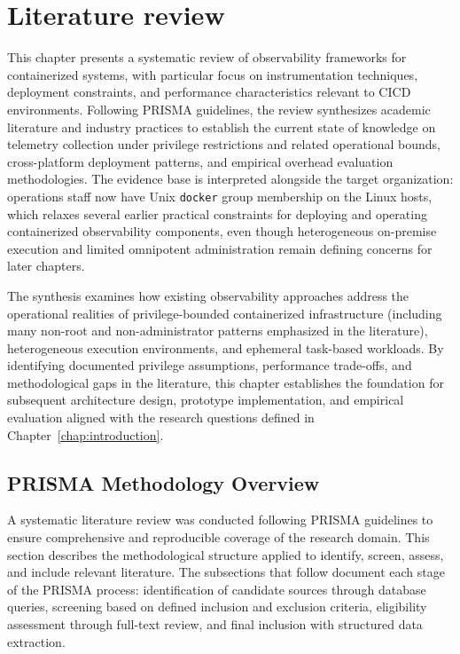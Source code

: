 
\chapter{Literature review} %
\label{chap:literature} %

This chapter presents a systematic review of observability frameworks for containerized systems, with particular focus on instrumentation techniques, deployment constraints, and performance characteristics relevant to \ac{CICD} environments. Following \ac{PRISMA} guidelines, the review synthesizes academic literature and industry practices to establish the current state of knowledge on telemetry collection under privilege restrictions and related operational bounds, cross-platform deployment patterns, and empirical overhead evaluation methodologies. The evidence base is interpreted alongside the target organization: operations staff now have Unix \texttt{docker} group membership on the Linux hosts, which relaxes several earlier practical constraints for deploying and operating containerized observability components, even though heterogeneous on-premise execution and limited omnipotent administration remain defining concerns for later chapters.

The synthesis examines how existing observability approaches address the operational realities of privilege-bounded containerized infrastructure (including many non-root and non-administrator patterns emphasized in the literature), heterogeneous execution environments, and ephemeral task-based workloads. By identifying documented privilege assumptions, performance trade-offs, and methodological gaps in the literature, this chapter establishes the foundation for subsequent architecture design, prototype implementation, and empirical evaluation aligned with the research questions defined in Chapter~\ref{chap:introduction}.

\section{PRISMA Methodology Overview}
A systematic literature review was conducted following \ac{PRISMA} guidelines to ensure comprehensive and reproducible coverage of the research domain. This section describes the methodological structure applied to identify, screen, assess, and include relevant literature. The subsections that follow document each stage of the \ac{PRISMA} process: identification of candidate sources through database queries, screening based on defined inclusion and exclusion criteria, eligibility assessment through full-text review, and final inclusion with structured data extraction.


